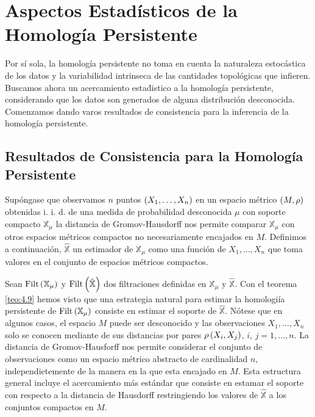 \chapter{Aspectos Estad\'isticos de la Homolog\'ia Persistente}\label{chap:Cap5}

Por s\'i sola, la homolog\'ia persistente no toma en cuenta la naturaleza estoc\'astica de los datos
y la variabilidad intrinseca de las cantidades topol\'ogicas que infieren.
Buscamos ahora un acercamiento esta\'distico a la homolog\'ia persistente,
considerando que los datos son generados de alguna distribuci\'on desconocida.
Comenzamos dando varos resultados de consistencia para la inferencia de la homolog\'ia persistente.

\section{Resultados de Consistencia para la Homolog\'ia Persistente}

Sup\'ongase que observamos $n$ puntos $\left(X_{1},\dots,X_{n}\right)$ en un espacio m\'etrico
$\left(M,\rho\right)$ obtenidas i. i. d. de una medida de probabilidad desconocida $\mu$ con
soporte compacto $\mathbb{X}_{\mu}$ la distancia de Gromov-Hausdorff nos permite comparar
$\mathbb{X}_{\mu}$ con otros espacios m\'etricos compactos no necesariamente encajados en $M$.
Definimos a continuaci\'on, $\hat{\mathbb{X}}$ un estimador de $\mathbb{X}_{\mu}$
como una funci\'on de $X_{1},\dots,X_{n}$ que toma valores en el conjunto de espacios m\'etricos compactos.

Sean $\mathrm{Filt}\left(\mathbb{X}_{\mu}\right)$ y $\mathrm{Filt}\left(\hat{\mathbb{X}}\right)$
dos filtraciones definidas en $\mathbb{X}_{\mu}$ y $\hat{\mathbb{X}}$.
Con el teorema \ref{teo:4.9} hemos visto que una estrategia natural
para estimar la homologi\'ia persistente de $\mathrm{Filt}\left(\mathbb{X}_{\mu}\right)$
consiste en estimar el soporte de $\hat{\mathbb{X}}$.
N\'otese que en algunos casos, el espacio $M$ puede ser desconocido
y las observaciones $X_{1},\dots,X_{n}$ solo se conocen mediante de sus distancias por pares
$\rho\left(X_{i}, X_{j}\right)$, $i$, $j = 1,\dots,n$.
La distancia de Gromov-Hausforff nos permite considerar el conjunto de observaciones
como un espacio m\'etrico abstracto de cardinalidad $n$,
independietemente de la manera en la que esta encajado en $M$.
Esta estructura general incluye el acercamiento m\'as est\'andar
que consiste en estamar el soporte con respecto a la distancia de Hausdorff
restringiendo los valores de $\hat{\mathbb{X}}$ a los conjuntos compactos en $M$.

